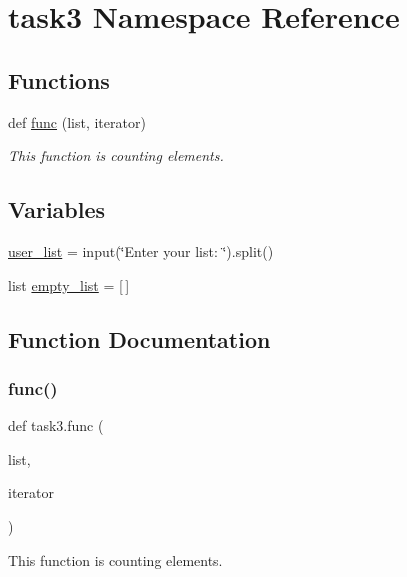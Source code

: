 \hypertarget{namespacetask3}{}\section{task3 Namespace Reference}
\label{namespacetask3}
\subsection*{Functions}
\begin{DoxyCompactItemize}
\item 
def \hyperlink{namespacetask3_a399c4bb28b70575d28d00ad0eb84b3da}{func} (list, iterator)
\begin{DoxyCompactList}\small\item\em This function is counting elements. \end{DoxyCompactList}\end{DoxyCompactItemize}
\subsection*{Variables}
\begin{DoxyCompactItemize}
\item 
\hyperlink{namespacetask3_a2c1df90f76670ac3e78d4d3a9c7aa92a}{user\+\_\+list} = input(\char`\"{}Enter your list\+: \char`\"{}).split()
\item 
list \hyperlink{namespacetask3_a89faa84f1abc229e0f6778a23d9a5fd6}{empty\+\_\+list} = \mbox{[}$\,$\mbox{]}
\end{DoxyCompactItemize}


\subsection{Function Documentation}
\mbox{\label{namespacetask3_a399c4bb28b70575d28d00ad0eb84b3da}} 
\subsubsection{\texorpdfstring{func()}{func()}}
{\footnotesize\ttfamily def task3.\+func (\begin{DoxyParamCaption}\item[{}]{list,  }\item[{}]{iterator }\end{DoxyParamCaption})}



This function is counting elements. 


